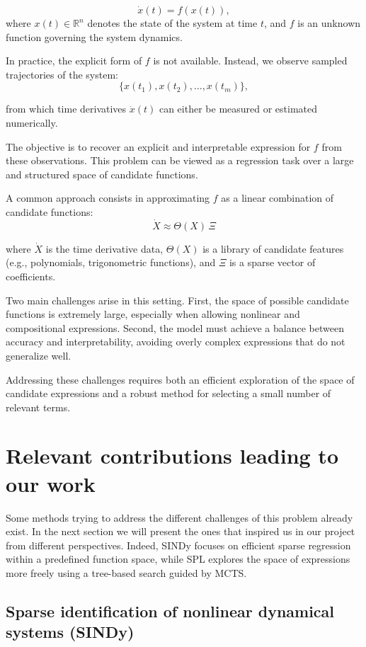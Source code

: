 \documentclass[11pt, a4paper]{article}
\begin{document}
\[
\dot{x}(t) = f(x(t)),
\]
where $x(t) \in \mathbb{R}^n$ denotes the state of the system at time $t$, and $f$ is an unknown function governing the system dynamics.

In practice, the explicit form of $f$ is not available. Instead, we observe sampled trajectories of the system:
\[
\{x(t_1), x(t_2), \dots, x(t_m)\},
\]

from which time derivatives $\dot{x}(t)$ can either be measured or estimated numerically.

The objective is to recover an explicit and interpretable expression for $f$ from these observations. This problem can be viewed as a regression task over a large and structured space of candidate functions.

A common approach consists in approximating $f$ as a linear combination of candidate functions:
$$ \dot{X} \approx \Theta(X) \, \Xi $$

where $\dot{X}$ is the time derivative data, $\Theta(X)$ is a library of candidate features (e.g., polynomials, trigonometric functions), and $\Xi$ is a sparse vector of coefficients. 

Two main challenges arise in this setting. First, the space of possible candidate functions is extremely large, especially when allowing nonlinear and compositional expressions. Second, the model must achieve a balance between accuracy and interpretability, avoiding overly complex expressions that do not generalize well.

Addressing these challenges requires both an efficient exploration of the space of candidate expressions and a robust method for selecting a small number of relevant terms.



\section{Relevant contributions leading to our work}

Some methods trying to address the different challenges of this problem already exist. In the next section we will present the ones that inspired us in our project from different perspectives. Indeed, SINDy focuses on efficient sparse regression within a predefined function space, while SPL explores the space of expressions more freely using a tree-based search guided by MCTS.

\subsection{Sparse identification of nonlinear dynamical systems (SINDy)}
\end{document}
